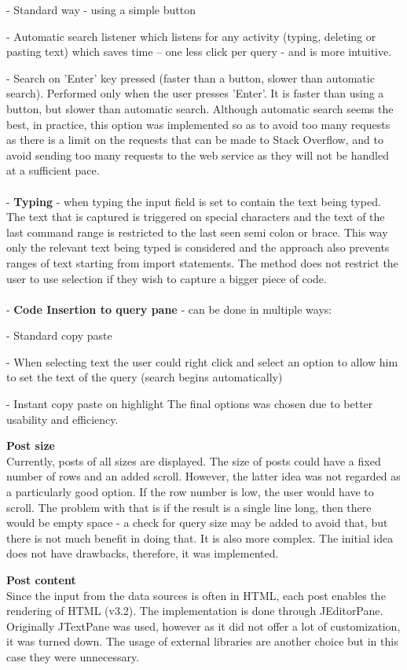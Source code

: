 \documentclass{l4proj}
\begin{document}
- Standard way - using a simple button

- Automatic search listener which listens for any activity (typing, deleting or pasting text) which saves time – one less click per query - and is more intuitive.

- Search on 'Enter' key pressed (faster than a button, slower than automatic search). Performed only when the user presses 'Enter'. It is faster than using a button, but slower than automatic search. Although automatic search seems the best, in practice, this option was implemented so as to avoid too many requests as there is a limit on the requests that can be made to Stack Overflow, and to avoid sending too many requests to the web service as they will not be handled at a sufficient pace.
\\
\\
- \textbf{Typing} - when typing the input field is set to contain the text being typed. The text that is captured is triggered on special characters and the text of the last command range is restricted to the last seen semi colon or brace. This way only the relevant text being typed is considered and the approach also prevents ranges of text starting from import statements. The method does not restrict the user to use selection if they wish to capture a bigger piece of code.  
\\
\\
- \textbf{Code Insertion to query pane} - can be done in multiple ways:

- Standard copy paste

- When selecting text the user could right click and select an option to allow him to set the text of the query (search begins automatically) 

- Instant copy paste on highlight
The final options was chosen due to better usability and efficiency.

\textbf{Post size}\\
Currently, posts of all sizes are displayed. The size of posts could have a fixed number of rows and an added scroll. However, the latter idea was not regarded as a particularly good option. If the row number is low, the user would have to scroll. The problem with that is if the result is a single line long, then there would be empty space - a check for query size may be added to avoid that, but there is not much benefit in doing that. It is also more complex. The initial idea does not have drawbacks, therefore, it was implemented.

\textbf{Post content}\\
Since the input from the data sources is often in HTML, each post enables the rendering of HTML (v3.2). The implementation is done through JEditorPane. Originally JTextPane was used, however as it did not offer a lot of customization, it was  turned down. The usage of external libraries are another choice but in this case they were unnecessary.
\end{document}
